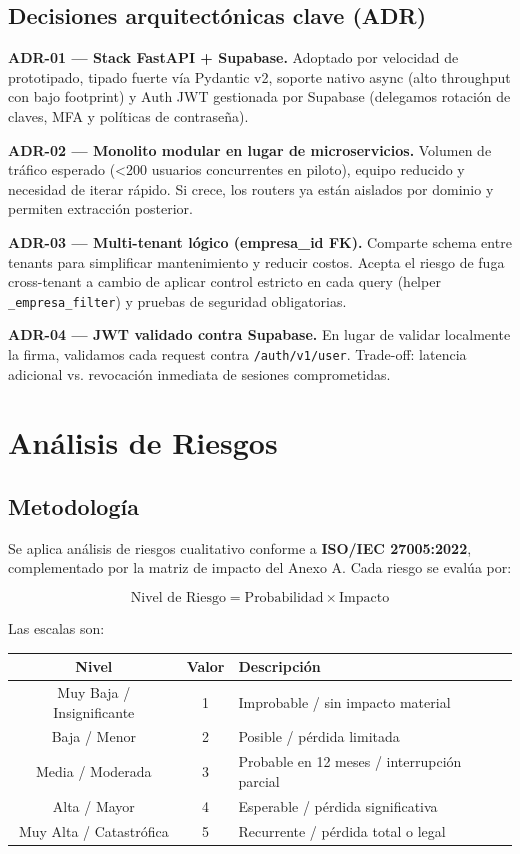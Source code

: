 \documentclass[12pt,a4paper,oneside]{article}
\begin{document}
\subsection{Decisiones arquitectónicas clave (ADR)}

\textbf{ADR-01 — Stack FastAPI + Supabase.} Adoptado por velocidad de prototipado, tipado fuerte vía Pydantic v2, soporte nativo async (alto throughput con bajo footprint) y Auth JWT gestionada por Supabase (delegamos rotación de claves, MFA y políticas de contraseña).

\textbf{ADR-02 — Monolito modular en lugar de microservicios.} Volumen de tráfico esperado (<200 usuarios concurrentes en piloto), equipo reducido y necesidad de iterar rápido. Si crece, los routers ya están aislados por dominio y permiten extracción posterior.

\textbf{ADR-03 — Multi-tenant lógico (empresa\_id FK).} Comparte schema entre tenants para simplificar mantenimiento y reducir costos. Acepta el riesgo de fuga cross-tenant a cambio de aplicar control estricto en cada query (helper \texttt{\_empresa\_filter}) y pruebas de seguridad obligatorias.

\textbf{ADR-04 — JWT validado contra Supabase.} En lugar de validar localmente la firma, validamos cada request contra \texttt{/auth/v1/user}. Trade-off: latencia adicional vs. revocación inmediata de sesiones comprometidas.

\section{Análisis de Riesgos}

\subsection{Metodología}

Se aplica análisis de riesgos cualitativo conforme a \textbf{ISO/IEC 27005:2022}, complementado por la matriz de impacto del Anexo A. Cada riesgo se evalúa por:

\[
\text{Nivel de Riesgo} = \text{Probabilidad} \times \text{Impacto}
\]

Las escalas son:

\begin{table}[h]
\centering
\begin{tabular}{ccl}
\toprule
\textbf{Nivel} & \textbf{Valor} & \textbf{Descripción} \\
\midrule
Muy Baja / Insignificante & 1 & Improbable / sin impacto material \\
Baja / Menor & 2 & Posible / pérdida limitada \\
Media / Moderada & 3 & Probable en 12 meses / interrupción parcial \\
Alta / Mayor & 4 & Esperable / pérdida significativa \\
Muy Alta / Catastrófica & 5 & Recurrente / pérdida total o legal \\
\bottomrule
\end{tabular}
\end{table}
\end{document}
